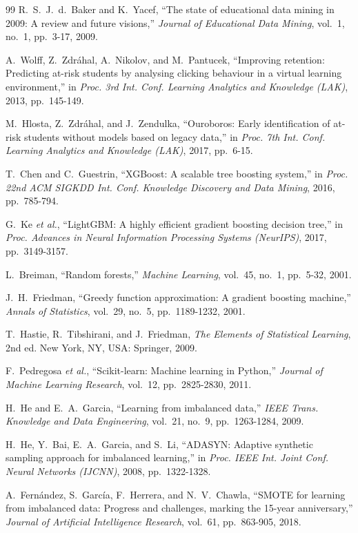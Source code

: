 \documentclass[conference]{IEEEtran}
\begin{document}
\begin{thebibliography}{99}
R.~S.~J.~d.~Baker and K.~Yacef, ``The state of educational data mining in
2009: A review and future visions,'' \emph{Journal of Educational Data
Mining}, vol.~1, no.~1, pp.~3-17, 2009.

A.~Wolff, Z.~Zdr\'ahal, A.~Nikolov, and M.~Pantucek, ``Improving retention:
Predicting at-risk students by analysing clicking behaviour in a virtual
learning environment,'' in \emph{Proc. 3rd Int. Conf. Learning Analytics and
Knowledge (LAK)}, 2013, pp.~145-149.

M.~Hlosta, Z.~Zdr\'ahal, and J.~Zendulka, ``Ouroboros: Early identification
of at-risk students without models based on legacy data,'' in \emph{Proc.
7th Int. Conf. Learning Analytics and Knowledge (LAK)}, 2017, pp.~6-15.

T.~Chen and C.~Guestrin, ``XGBoost: A scalable tree boosting system,'' in
\emph{Proc. 22nd ACM SIGKDD Int. Conf. Knowledge Discovery and Data Mining},
2016, pp.~785-794.

G.~Ke \emph{et al.}, ``LightGBM: A highly efficient gradient boosting
decision tree,'' in \emph{Proc. Advances in Neural Information Processing
Systems (NeurIPS)}, 2017, pp.~3149-3157.

L.~Breiman, ``Random forests,'' \emph{Machine Learning}, vol.~45, no.~1,
pp.~5-32, 2001.

J.~H.~Friedman, ``Greedy function approximation: A gradient boosting
machine,'' \emph{Annals of Statistics}, vol.~29, no.~5, pp.~1189-1232, 2001.

T.~Hastie, R.~Tibshirani, and J.~Friedman, \emph{The Elements of Statistical
Learning}, 2nd ed. New York, NY, USA: Springer, 2009.

F.~Pedregosa \emph{et al.}, ``Scikit-learn: Machine learning in Python,''
\emph{Journal of Machine Learning Research}, vol.~12, pp.~2825-2830, 2011.

H.~He and E.~A.~Garcia, ``Learning from imbalanced data,'' \emph{IEEE Trans.
Knowledge and Data Engineering}, vol.~21, no.~9, pp.~1263-1284, 2009.

H.~He, Y.~Bai, E.~A.~Garcia, and S.~Li, ``ADASYN: Adaptive synthetic
sampling approach for imbalanced learning,'' in \emph{Proc. IEEE Int. Joint
Conf. Neural Networks (IJCNN)}, 2008, pp.~1322-1328.

A.~Fern\'andez, S.~Garc\'ia, F.~Herrera, and N.~V.~Chawla, ``SMOTE for
learning from imbalanced data: Progress and challenges, marking the 15-year
anniversary,'' \emph{Journal of Artificial Intelligence Research}, vol.~61,
pp.~863-905, 2018.


\end{thebibliography}
\end{document}
